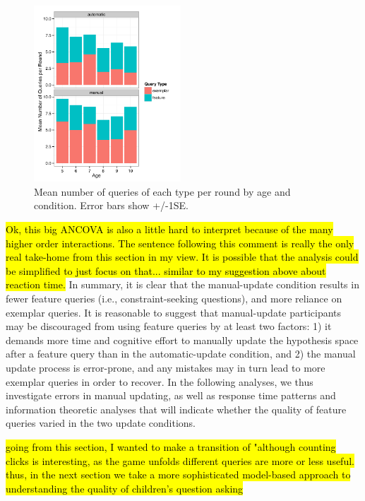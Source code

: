\documentclass[10pt,letterpaper]{article}
\begin{document}
\begin{figure}[h]
  \centering
  \includegraphics[width=0.49\textwidth]{figures/clicks_by_age_condition_query_type}
  \caption{Mean number of queries of each type per round by age and condition. 
Error bars show +/-1SE.}
  \label{fig:clicks-per-agecond}
\end{figure} 

\hl{Ok, this big ANCOVA is also a little hard to interpret because of the many
higher order interactions.  The sentence following this comment is really the only
real take-home from this section in my view.  It is possible that the analysis could
be simplified to just focus on that... similar to my suggestion above about reaction time.}
In summary, it is clear that the manual-update condition results in fewer feature 
queries (i.e., constraint-seeking questions), and more reliance on exemplar queries. 
It is reasonable to suggest that manual-update participants may be discouraged 
from using feature queries by at least two factors: 1) it demands more time and 
cognitive effort to manually update the hypothesis space after a feature query than 
in the automatic-update condition, and 2) the manual update process is error-prone, 
and any mistakes may in turn lead to more exemplar queries in order to recover. In 
the following analyses, we thus investigate errors in manual updating, as well as 
response time patterns and information theoretic analyses that will indicate whether 
the quality of feature queries varied in the two update conditions.

\hl{going from this section, I wanted to make a transition of "although counting
clicks is interesting, as the game unfolds different queries are more or less useful.
thus, in the next section we take a more sophisticated model-based approach to
understanding the quality of children's question asking}
\end{document}
